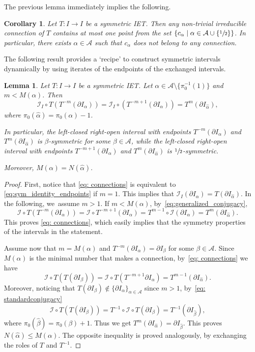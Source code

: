 \documentclass[10pt,a4paper]{amsart}
\theoremstyle{plain}
\newtheorem{lemma}[theorem]{Lemma}
\newtheorem{corollary}[theorem]{Corollary}
\theoremstyle{definition}
\newcommand{\A}{\mathcal{A}}
\newcommand{\I}{\mathcal{I}}
\begin{document}
The previous lemma immediately implies the following.

\begin{corollary}
\label{cor:centers_connections}
Let $T: I \to I$ be a symmetric IET. Then any non-trivial irreducible connection of $T$ contains at most one point from the set $\left\{c_\alpha \mid \alpha \in \A \cup \{\sfrac{1}{2}\} \right\}$. In particular, there exists $\alpha \in \A$ such that $c_\alpha$ does not belong to any connection.
\end{corollary}

The following result provides a `recipe' to construct symmetric intervals dynamically by using iterates of the endpoints of the exchanged intervals.

\begin{lemma}\label{lem: sym_endpoints}
{Let $T : I \to I$ be a symmetric IET.}
Let $\alpha\in\mathcal A\setminus\{\pi_0^{-1}(1)\}$ and $m< M(\alpha)$. Then
\begin{equation}\label{eq: connections}
\I_I\circ T(T^{-m}(\partial I_{\alpha}))={\I_I\circ (T^{-m+1}(\partial I_{\alpha}))}=T^m(\partial I_{\hat\alpha}),
\end{equation}
where $\pi_0(\hat\alpha)=\pi_0(\alpha)-1$.

In particular, the left-closed right-open interval with endpoints $T^{-m}(\partial I_{\alpha})$ and $T^m(\partial I_{\hat\alpha})$ is {$\beta$-symmetric for some $\beta\in\A$, while the left-closed right-open interval with endpoints $T^{-m+1}(\partial I_{\alpha})$ and $T^m(\partial I_{\hat\alpha})$ is $\sfrac{1}{2}$-symmetric}.

Moreover, $M(\alpha)= N(\hat\alpha)$.
\end{lemma}

\begin{proof}
First, notice that \eqref{eq: connections} is equivalent to \eqref{eq:sym_identity_endpoints} if $m = 1$. This implies that $\I_I(\partial I_\alpha) = T(\partial I_{\hat\alpha})$.
In the following, we~assume $m > 1$. If $m < M(\alpha)$, by~\eqref{eq:generalized_conjugacy},
\[
\I\circ T(T^{-m}(\partial I_{\alpha}))= \I \circ T^{-m + 1}(\partial I_\alpha) = T^{m - 1} \circ \I (\partial I_\alpha) = T^m(\partial I_{\hat \alpha}).
\]
This proves \eqref{eq: connections}, which easily implies that the symmetry properties of the intervals in the statement.

Assume now that $m=M(\alpha)$ and $T^{-m}(\partial I_{\alpha})=\partial I_{\beta}$ for some $\beta\in \A$. Since $M(\alpha)$ is the minimal number that makes a connection, by~\eqref{eq: connections} we have
\[
\I\circ T(T(\partial I_{\beta}))=\I\circ T(T^{-{m+1}}\partial I_{\alpha})=T^{m-1}(\partial I_{\hat\alpha}).
\]
Moreover, noticing that $T(\partial I_\beta) \notin \{\partial I_\alpha\}_{\alpha \in \A}$ since $m > 1$, by~\eqref{eq: standardconjugacy}
\[
\I\circ T(T(\partial I_{\beta}))=T^{-1}\circ\I\circ T(\partial I_{\beta})
=T^{-1}(\partial I_{\hat\beta}),
\]
where $\pi_0(\hat\beta)=\pi_0(\beta)+1$. Thus we get $T^{m}(\partial I_{\hat\alpha})=\partial I_{\hat\beta}$. This proves $N(\hat\alpha)\le M(\alpha)$. The opposite inequality is proved analogously, {by exchanging the roles of $T$ and $T^{-1}$.}
\end{proof}
\end{document}
